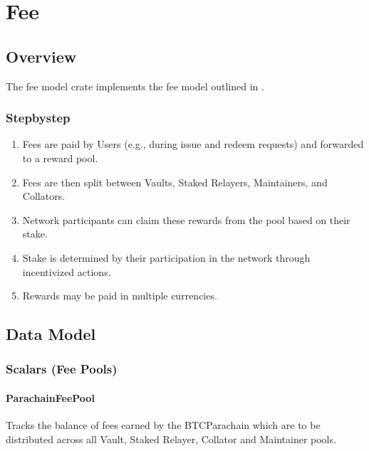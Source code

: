 \documentclass[a4paper,10pt,english]{sphinxmanual}
\begin{document}
\chapter{Fee}
\label{\detokenize{spec/fee:fee}}\label{\detokenize{spec/fee::doc}}

\section{Overview}
\label{\detokenize{spec/fee:overview}}
The fee model crate implements the fee model outlined in {\hyperref[\detokenize{economics/fees:fee-model}]{}}.


\subsection{Step\sphinxhyphen{}by\sphinxhyphen{}step}
\label{\detokenize{spec/fee:step-by-step}}\begin{enumerate}
%
\item {} 
Fees are paid by Users (e.g., during issue and redeem requests) and forwarded to a reward pool.

\item {} 
Fees are then split between Vaults, Staked Relayers, Maintainers, and Collators.

\item {} 
Network participants can claim these rewards from the pool based on their stake.

\item {} 
Stake is determined by their participation in the network \sphinxhyphen{} through incentivized actions.

\item {} 
Rewards may be paid in multiple currencies.

\end{enumerate}


\section{Data Model}
\label{\detokenize{spec/fee:data-model}}

\subsection{Scalars (Fee Pools)}
\label{\detokenize{spec/fee:scalars-fee-pools}}

\subsubsection{ParachainFeePool}
\label{\detokenize{spec/fee:parachainfeepool}}
Tracks the balance of fees earned by the BTC\sphinxhyphen{}Parachain which are to be distributed across all Vault, Staked Relayer, Collator and Maintainer pools.
\end{document}
